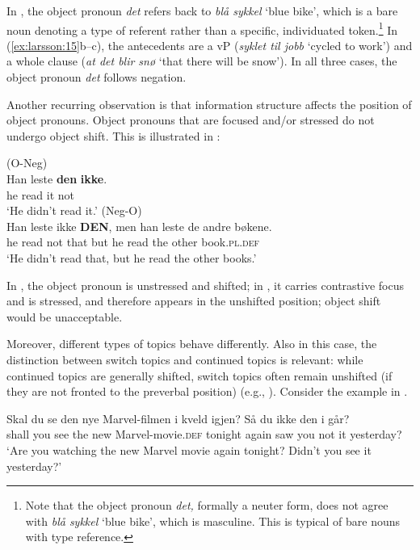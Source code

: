 \documentclass[output=paper]{langscibook}
\begin{document}
In , the object pronoun \textit{det} refers back to \textit{blå sykkel} ‘blue bike’, which is a bare noun \citep{Borthen2003} denoting a type of referent rather than a specific, individuated token.\footnote{Note that the object pronoun \textit{det,} formally a neuter form, does not agree with \textit{blå sykkel} ‘blue bike’, which is masculine. This is typical of bare nouns with type reference.} In (\ref{ex:larsson:15}b–c), the antecedents are a vP (\textit{syklet til jobb} ‘cycled to work’) and a whole clause (\textit{at det blir snø} ‘that there will be snow’). In all three cases, the object pronoun \textit{det} follows negation. 

Another recurring observation is that information structure affects the position of object pronouns. Object pronouns that are focused and/or stressed do not undergo object shift. This is illustrated in :

\ea%
    \label{ex:larsson:16}
    \ea (O-Neg)\label{ex:larsson:16a}\\
	\gll Han leste \textbf{den} \textbf{ikke}.\\
		 he read it not\\
	\glt ‘He didn’t read it.’
	\ex (Neg-O)\label{ex:larsson:16b}\\
	\gll Han leste ikke \textbf{DEN}, men han leste de andre bøkene.\\
		he read not that but he read the other book.\textsc{pl.def}\\
	\glt ‘He didn’t read that, but he read the other books.’
    \z %
\z

In , the object pronoun is unstressed and shifted; in , it carries contrastive focus and is stressed, and therefore appears in the unshifted position; object shift would be unacceptable.

Moreover, different types of topics behave differently. Also in this case, the distinction between switch topics and continued topics is relevant: while continued topics are generally shifted, switch topics often remain unshifted (if they are not fronted to the preverbal position) (e.g., \citealt{BentzenAnderssen2019, LindahlEngdahl2022}).  Consider the example in .

\ea%
    \label{ex:larsson:17}
    \gll Skal du se den nye Marvel-filmen {i kveld} igjen? Så du ikke den {i går?}\\
         shall you see the new Marvel-movie.\textsc{def} tonight again saw you not it yesterday?\\
    \glt ‘Are you watching the new Marvel movie again tonight? Didn’t you see it yesterday?’ 
    \z %
\end{document}
